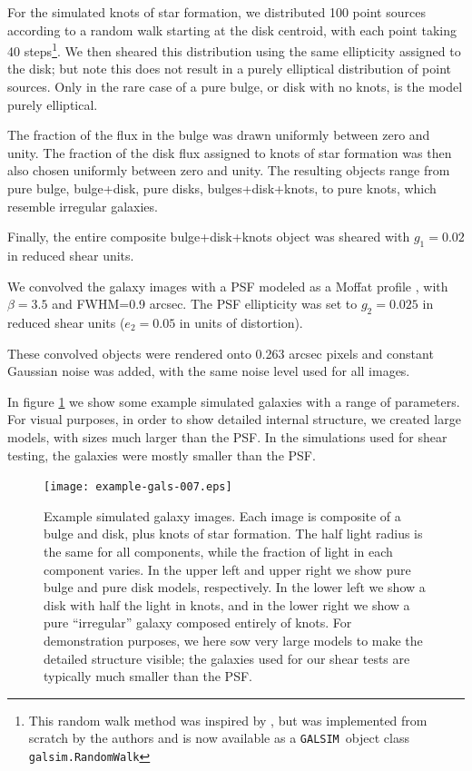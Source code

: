 \documentclass[a4paper,fleqn,usenatbib]{mnras}
\newcommand{\galsim}{\texttt{GALSIM}}
\begin{document}
For the simulated knots of star formation, we distributed 100 point sources
according to a random walk starting at the disk centroid, with each point
taking 40 steps\footnote{This random walk method was inspired by
\cite{Zhang2008FourierQuadI}, but was implemented from scratch by the authors
and is now available as a \galsim\ object class \texttt{galsim.RandomWalk}}.
We then sheared this distribution using the same ellipticity assigned to the
disk; but note this does not result in a purely elliptical distribution of
point sources.  Only in the rare case of a pure bulge, or disk with no knots,
is the model purely elliptical.

The fraction of the flux in the bulge was drawn uniformly between zero and
unity.  The fraction of the disk flux assigned to knots of star formation
was then also chosen uniformly between zero and unity.  The resulting 
objects range from pure bulge, bulge+disk, pure disks, bulges+disk+knots, 
to pure knots, which resemble irregular galaxies.

Finally, the entire composite bulge+disk+knots object was sheared with
$g_1=0.02$ in reduced shear units.

We convolved the galaxy images with a PSF modeled as a Moffat profile
\citep{Moffat1969}, with $\beta=3.5$ and FWHM=0.9 arcsec. The PSF ellipticity was set to $g_2 = 0.025$ in reduced shear units ($e_2 =
0.05$ in units of distortion). 

These convolved objects were rendered onto 0.263 arcsec pixels and constant
Gaussian noise was added, with the same noise level used for all images.

In figure \ref{fig:parametricgals} we show some example simulated galaxies with
a range of parameters.  For visual purposes, in order to show detailed internal
structure, we created large models, with sizes much larger than the PSF.  In
the simulations used for shear testing, the galaxies were mostly smaller than
the PSF.


\begin{figure}
    \centering
    \texttt{[image: example-gals-007.eps]}

    \caption{Example simulated galaxy images.  Each image is composite of a
    bulge and disk, plus knots of star formation.  The half light radius is the
    same for all components, while the fraction of light in each component
    varies.  In the upper left and upper right we show pure bulge and pure disk
    models, respectively.  In the lower left we show a disk with half the light
    in knots, and in the lower right we show a pure ``irregular'' galaxy
    composed entirely of knots.  For demonstration purposes, we here sow very
    large models to make the detailed structure visible; the galaxies used for
    our shear tests are typically much smaller than the PSF. }

	\label{fig:parametricgals}

\end{figure}
\end{document}
